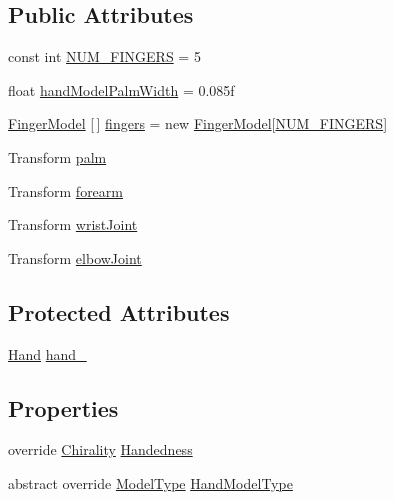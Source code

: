\subsection*{Public Attributes}
\begin{DoxyCompactItemize}
\item 
const int \mbox{\hyperlink{class_leap_1_1_unity_1_1_hand_model_a251c19cef47a9e349acfaa333219a495}{N\+U\+M\+\_\+\+F\+I\+N\+G\+E\+RS}} = 5
\item 
float \mbox{\hyperlink{class_leap_1_1_unity_1_1_hand_model_ad8d407041200583ebc8e414fb903b87c}{hand\+Model\+Palm\+Width}} = 0.\+085f
\item 
\mbox{\hyperlink{class_leap_1_1_unity_1_1_finger_model}{Finger\+Model}} \mbox{[}$\,$\mbox{]} \mbox{\hyperlink{class_leap_1_1_unity_1_1_hand_model_a51a8c47034746f5961815b6276db2eee}{fingers}} = new \mbox{\hyperlink{class_leap_1_1_unity_1_1_finger_model}{Finger\+Model}}\mbox{[}\mbox{\hyperlink{class_leap_1_1_unity_1_1_hand_model_a251c19cef47a9e349acfaa333219a495}{N\+U\+M\+\_\+\+F\+I\+N\+G\+E\+RS}}\mbox{]}
\item 
Transform \mbox{\hyperlink{class_leap_1_1_unity_1_1_hand_model_a9ed203915ef3ad91ea37b705c1fcffa1}{palm}}
\item 
Transform \mbox{\hyperlink{class_leap_1_1_unity_1_1_hand_model_a50b236af9574f8f2b5e9fedba8aa5ff0}{forearm}}
\item 
Transform \mbox{\hyperlink{class_leap_1_1_unity_1_1_hand_model_a5dd72502f20abe5fcddbeabe6bf0bfc9}{wrist\+Joint}}
\item 
Transform \mbox{\hyperlink{class_leap_1_1_unity_1_1_hand_model_a171cf7f14613147a8f0dff7dfd3efd91}{elbow\+Joint}}
\end{DoxyCompactItemize}
\subsection*{Protected Attributes}
\begin{DoxyCompactItemize}
\item 
\mbox{\hyperlink{class_leap_1_1_hand}{Hand}} \mbox{\hyperlink{class_leap_1_1_unity_1_1_hand_model_a5021ce9e2077ee8616ac608409133d5c}{hand\+\_\+}}
\end{DoxyCompactItemize}
\subsection*{Properties}
\begin{DoxyCompactItemize}
\item 
override \mbox{\hyperlink{namespace_leap_1_1_unity_a4d15adcf20ba121b2cd9c07f503b606f}{Chirality}} \mbox{\hyperlink{class_leap_1_1_unity_1_1_hand_model_adc0cdab6a0de6c0520a100bfff19a6cd}{Handedness}}
\item 
abstract override \mbox{\hyperlink{namespace_leap_1_1_unity_a186e5eb0a2b743f1f6b79346f0ab8ad0}{Model\+Type}} \mbox{\hyperlink{class_leap_1_1_unity_1_1_hand_model_ab4ffcf0352b78eea4981a4498656fb93}{Hand\+Model\+Type}}
\end{DoxyCompactItemize}
